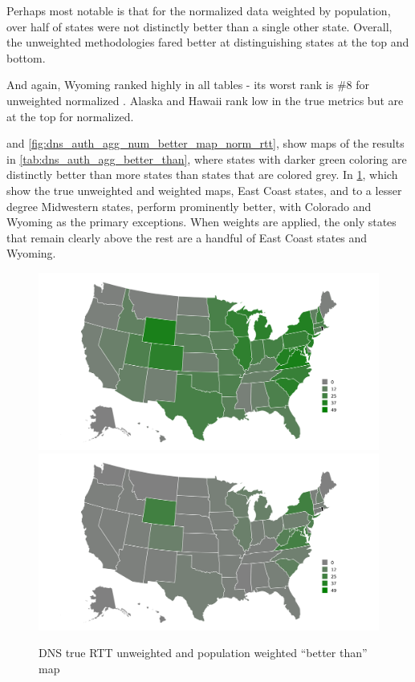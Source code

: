 

Perhaps most notable is that for the normalized \rtt data weighted by population, over half of states were not distinctly better than a single other state. Overall, the unweighted methodologies fared better at distinguishing states at the top and bottom. 

And again, Wyoming ranked highly in all tables - its worst rank is \#8 for unweighted normalized \rtt. Alaska and Hawaii rank low in the true \rtt metrics but are at the top for normalized.

 and \cref{fig:dns_auth_agg_num_better_map_norm_rtt}, show maps of the results in \cref{tab:dns_auth_agg_better_than}, where states with darker green coloring are distinctly better than more states than states that are colored grey. In \cref{fig:dns_auth_agg_num_better_map_rtt}, which show the true \rtt unweighted and weighted maps, East Coast states, and to a lesser degree Midwestern states, perform prominently better, with Colorado and Wyoming as the primary exceptions. When weights are applied, the only states that remain clearly above the rest are a handful of East Coast states and Wyoming.

\begin{figure}[htb]
    \centering
    \includegraphics[width=.6\textwidth]{images/dns/analysis_auth_agg/rtt/unweighted/num_better_than_map_rtt_un.png}\\
    \includegraphics[width=.6\textwidth]{images/dns/analysis_auth_agg/rtt/population/num_better_than_map_rtt_pop.png}
    \caption{DNS true RTT unweighted and population weighted ``better than'' map}
    \label{fig:dns_auth_agg_num_better_map_rtt}
\end{figure}

